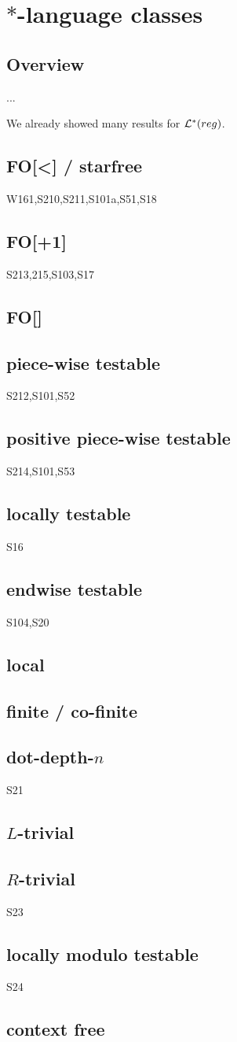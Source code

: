 \section{$*$-language classes}

\subsection{Overview}

...

We already showed many results for $\mathcal{L}^*(reg)$.

\subsection{FO[<] / starfree} W161,S210,S211,S101a,S51,S18
\subsection{FO[+1]} S213,215,S103,S17
\subsection{FO[]}
\subsection{piece-wise testable} S212,S101,S52
\subsection{positive piece-wise testable} S214,S101,S53
\subsection{locally testable} S16
\subsection{endwise testable} S104,S20
\subsection{local}
\subsection{finite / co-finite}
\subsection{dot-depth-$n$} S21
\subsection{$L$-trivial}
\subsection{$R$-trivial} S23
\subsection{locally modulo testable} S24


\subsection{context free}

